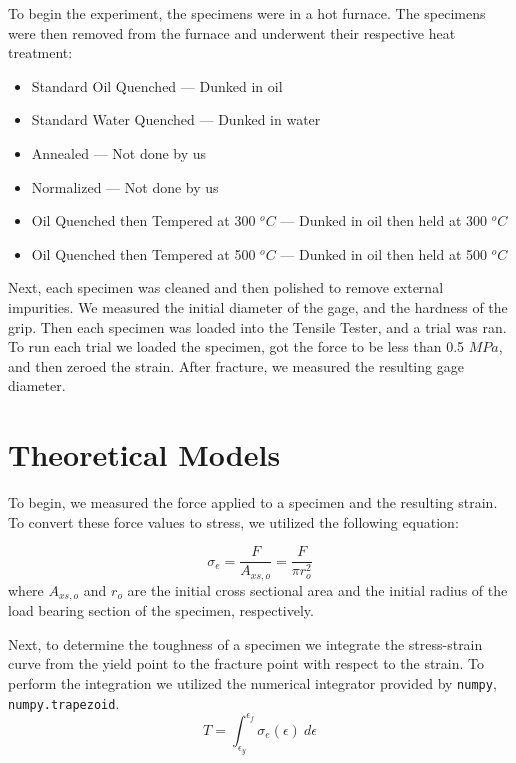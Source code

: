 \documentclass{article}
\begin{document}
To begin the experiment, the specimens were in a hot furnace. The specimens were then removed from the furnace and underwent their respective heat treatment:
\begin{itemize}
     \item Standard Oil Quenched --- Dunked in oil 
     \item Standard Water Quenched --- Dunked in water
     \item Annealed --- Not done by us
     \item Normalized --- Not done by us 
     \item Oil Quenched then Tempered at 300 $^oC$ --- Dunked in oil then held at 300 $^oC$
     \item Oil Quenched then Tempered at 500 $^oC$ --- Dunked in oil then held at 500 $^oC$
\end{itemize}

Next, each specimen was cleaned and then polished to remove external impurities. We measured the initial diameter of the gage, and the hardness of the grip. Then each specimen was loaded into the Tensile Tester, and a trial was ran. To run each trial we loaded the specimen, got the force to be less than 0.5 $MPa$, and then zeroed the strain. After fracture, we measured the resulting gage diameter. 

\newpage
\section{Theoretical Models}
To begin, we measured the force applied to a specimen and the resulting strain. To convert these force values to stress, we utilized the following equation:

\begin{equation}
    \sigma_e = \frac{F}{A_{xs,o}} = \frac{F}{\pi r_{o}^2}
\end{equation}
where $A_{xs,o}$ and $r_o$ are the initial cross sectional area and the initial radius of the load bearing section of the specimen, respectively. 

Next, to determine the toughness of a specimen we integrate the stress-strain curve from the yield point to the fracture point with respect to the strain. To perform the integration we utilized the numerical integrator provided by \texttt{numpy}, \texttt{numpy.trapezoid}. 
\begin{equation}
    T = \int_{\epsilon_{y}}^{\epsilon_{f}}\sigma_e\left(\epsilon\right)\ d\epsilon
\end{equation}
\end{document}

